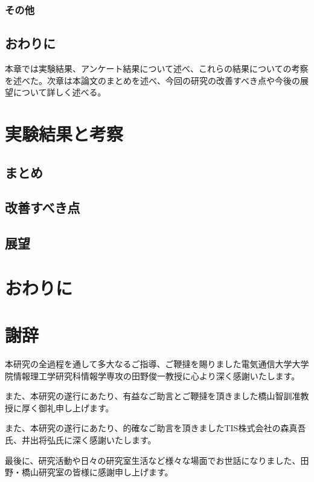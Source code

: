 \documentclass[11pt,a4j, titlepage]{jarticle} %
\begin{document}
\subsubsection{その他}


\subsection{おわりに}
本章では実験結果、アンケート結果について述べ、これらの結果についての考察を述べた。次章は本論文のまとめを述べ、今回の研究の改善すべき点や今後の展望について詳しく述べる。

\newpage
\section{実験結果と考察}
\subsection{まとめ}


\subsection{改善すべき点}


\subsection{展望}

\newpage
\section{おわりに}


\section*{謝辞}
本研究の全過程を通して多大なるご指導、ご鞭撻を賜りました電気通信大学大学院情報理工学研究科情報学専攻の田野俊一教授に心より深く感謝いたします。

また、本研究の遂行にあたり、有益なご助言とご鞭撻を頂きました橋山智訓准教授に厚く御礼申し上げます。

また、本研究の遂行にあたり、的確なご助言を頂きましたTIS株式会社の森真吾氏、井出将弘氏に深く感謝いたします。

最後に、研究活動や日々の研究室生活など様々な場面でお世話になりました、田野・橋山研究室の皆様に感謝申し上げます。
\end{document}

